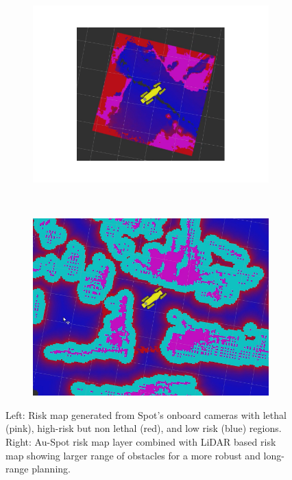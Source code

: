 \documentclass[letterpaper, 10pt, conference]{ieeeconf}      %
\begin{document}
\begin{figure}[thpb]
   \centering
    \begin{subfigure}{0.5\linewidth}
        \centering
        \includegraphics[trim={4cm 3cm 4cm 3.5cm},clip, width=\linewidth]{graphics/costmap_bd2.png}
    \end{subfigure}%
    ~
    \begin{subfigure}{0.5\linewidth}
        \centering
        \includegraphics[trim={1cm 1cm 1cm 1cm},clip, width=\linewidth]{graphics/costmap_bd2_embedded.png}
    \end{subfigure}
    \caption{Left:  Risk map generated from Spot's onboard cameras with lethal (pink), high-risk but non lethal (red), and low risk (blue) regions. Right: Au-Spot risk map layer combined with LiDAR based risk map showing larger range of obstacles for a more robust and long-range planning.}
    \label{bd_costmap}
\end{figure}
\end{document}
